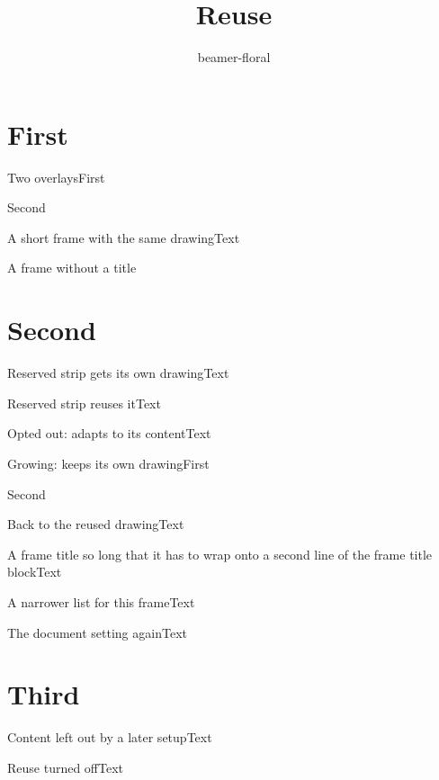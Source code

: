 \documentclass[aspectratio=169]{beamer}
\title{Reuse}\author{beamer-floral}\date{}
\begin{document}
\begin{frame}[plain]\titlepage\end{frame}
\section{First}
\begin{frame}{Two overlays}First\pause\par Second\end{frame}
\begin{frame}{A short frame with the same drawing}Text\end{frame}
\begin{frame}A frame without a title\end{frame}
\section{Second}
\florareserve{0pt}{0pt}{\the\paperwidth}{\the\dimexpr 1.5cm\relax}
\begin{frame}{Reserved strip gets its own drawing}Text\end{frame}
\begin{frame}{Reserved strip reuses it}Text\end{frame}
\floraclearreserve
{}
\begin{frame}{Opted out: adapts to its content}Text\end{frame}
\begin{frame}{Growing: keeps its own drawing}First\pause\par Second\end{frame}
\begin{frame}{Back to the reused drawing}Text\end{frame}
\begin{frame}{A frame title so long that it has to wrap onto a second line of the frame title block}Text\end{frame}
\begin{frame}{A narrower list for this frame}Text\end{frame}
\begin{frame}{The document setting again}Text\end{frame}
\section{Third}
\begin{frame}{Content left out by a later setup}Text\end{frame}
\begin{frame}{Reuse turned off}Text\end{frame}
\end{document}
